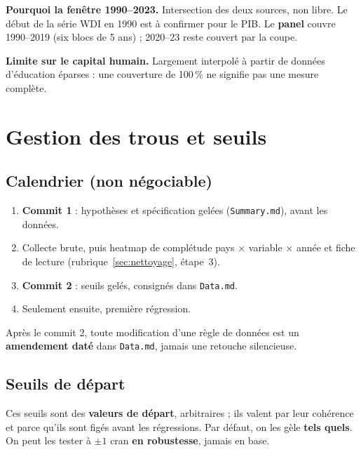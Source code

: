 \documentclass[21pt,a4paper]{article}
\begin{document}
	\textbf{Pourquoi la fenêtre 1990--2023.} Intersection des deux sources, non libre. Le début de la série WDI en 1990 est à confirmer pour le PIB. Le \textbf{panel} couvre 1990--2019 (six blocs de 5 ans) ; 2020--23 reste couvert par la coupe.
	
	\textbf{Limite sur le capital humain.} Largement interpolé à partir de données d'éducation éparses : une couverture de 100\,\% ne signifie pas une mesure complète.
	
	\section{Gestion des trous et seuils}
	\label{sec:trous}
	
	\subsection{Calendrier (non négociable)}
	
	\begin{enumerate}
		\item \textbf{Commit 1} : hypothèses et spécification gelées (\texttt{Summary.md}), avant les données.
		\item Collecte brute, puis heatmap de complétude pays $\times$ variable $\times$ année et fiche de lecture (rubrique~\ref{sec:nettoyage}, étape~3).
		\item \textbf{Commit 2} : seuils gelés, consignés dans \texttt{Data.md}.
		\item Seulement ensuite, première régression.
	\end{enumerate}
	
	Après le commit 2, toute modification d'une règle de données est un \textbf{amendement daté} dans \texttt{Data.md}, jamais une retouche silencieuse.
	
	\subsection{Seuils de départ}
	\label{sec:seuils-depart}
	
	Ces seuils sont des \textbf{valeurs de départ}, arbitraires ; ils valent par leur cohérence et parce qu'ils sont figés avant les régressions. Par défaut, on les gèle \textbf{tels quels}. On peut les tester à $\pm 1$ cran \textbf{en robustesse}, jamais en base.
	
\end{document}
